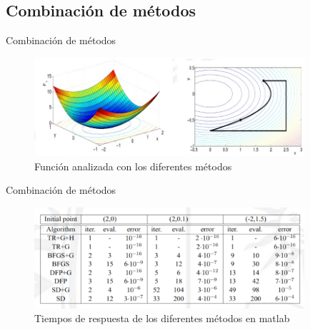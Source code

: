 \documentclass{beamer}
\begin{document}
    \subsection{Combinación de métodos}
        \begin{frame}{Combinación de métodos}
            \begin{figure}[h]
                \centering
                \captionsetup{justification=centering}
                \includegraphics[width=10cm]{Imagenes/Funciones convexas.jpg}
                \caption{Función analizada con los diferentes métodos}
                \centering
            \end{figure}
        \end{frame}
        \begin{frame}{Combinación de métodos}
            \begin{figure}[h]
                \centering
                \captionsetup{justification=centering}
                \includegraphics[width=10cm]{Imagenes/Captura de pantalla 2024-03-09 155904.png}
                \caption{Tiempos de respuesta de los diferentes métodos en matlab}
                \centering
            \end{figure}
        \end{frame}
\end{document}
